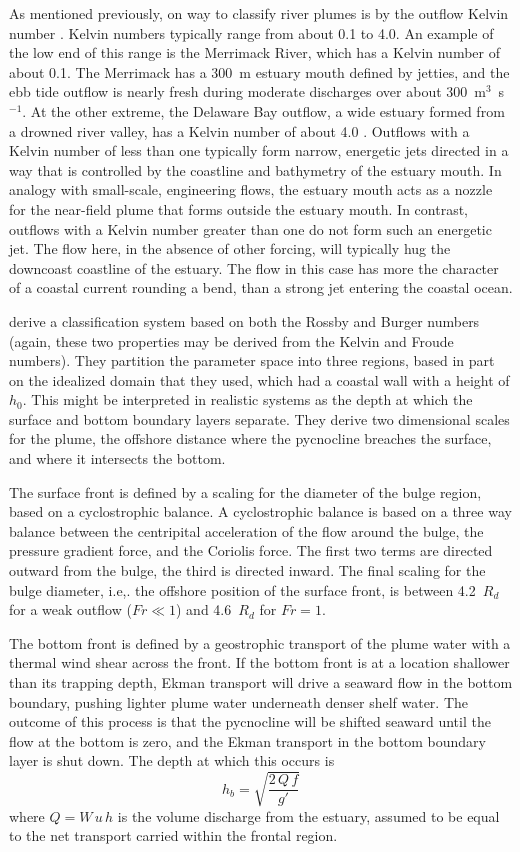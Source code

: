 \documentclass[11pt]{report}
\numberwithin{equation}{section}
\begin{document}
As mentioned previously, on way to classify river plumes is by the outflow Kelvin number \citep{garvine:95}.  Kelvin numbers typically range from about 0.1 to 4.0.  An example of the low end of this range is the Merrimack River, which has a Kelvin number of about 0.1.  The Merrimack has a 300~m estuary mouth defined by jetties, and the ebb tide outflow is nearly fresh during moderate discharges over about 300~m$^3$~s$^{-1}$.  At the other extreme, the Delaware Bay outflow, a wide estuary formed from a drowned river valley, has a Kelvin number of about 4.0 \citep{garvine:95}.  Outflows with a Kelvin number of less than one typically form narrow, energetic jets directed in a way that is controlled by the coastline and bathymetry of the estuary mouth.  In analogy with small-scale, engineering flows, the estuary mouth acts as a nozzle for the near-field plume that forms outside the estuary mouth.  In contrast, outflows with a Kelvin number greater than one do not form such an energetic jet.  The flow here, in the absence of other forcing, will typically hug the downcoast coastline of the estuary.  The flow in this case has more the character of a coastal current rounding a bend, than a strong jet entering the coastal ocean.

\citet{yankovsky.chapman:97} derive a classification system based on both the Rossby and Burger numbers (again, these two properties may be derived from the Kelvin and Froude numbers).  They partition the parameter space into three regions, based in part on the idealized domain that they used, which had a coastal wall with a height of $h_0$.  This might be interpreted in realistic systems as the depth at which the surface and bottom boundary layers separate.  They derive two dimensional scales for the plume, the offshore distance where the pycnocline breaches the surface, and where it intersects the bottom.  

The surface front is defined by a scaling for the diameter of the bulge region, based on a cyclostrophic balance.  A cyclostrophic balance is based on a three way balance between the centripital acceleration of the flow around the bulge,  the pressure gradient force, and the Coriolis force.  The first two terms are directed outward from the bulge, the third is directed inward.  The final scaling for the bulge diameter, i.e,. the offshore position of the surface front, is between 4.2~$R_d$ for a weak outflow ($Fr\ll1$) and 4.6~$R_d$ for $Fr=1$.

The bottom front is defined by a geostrophic transport of the plume water with a thermal wind shear across the front.  If the bottom front is at a location shallower than its trapping depth, Ekman transport will drive a seaward flow in the bottom boundary, pushing lighter plume water underneath denser shelf water.  The outcome of this process is that the pycnocline will be shifted seaward until the flow at the bottom is zero, and the Ekman transport in the bottom boundary layer is shut down.  The depth at which this occurs is
\begin{equation}
    h_b = \sqrt{ \frac{2\,Q\,f}{g'} }
\end{equation}
where $Q=W\,u\,h$ is the volume discharge from the estuary, assumed to be equal to the net transport carried within the frontal region.
\end{document}
